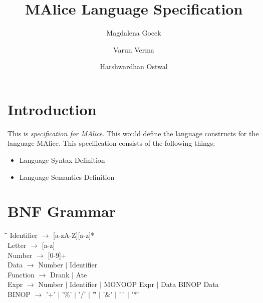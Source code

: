 \documentclass[a4wide, 11pt]{article}
\begin{document}
\title{MAlice Language Specification}

\author{Magdalena Gocek \and Varun Verma \and Harshwardhan Ostwal}


\maketitle            %

\section{Introduction}

This is \emph{specification for MAlice}. This would define the language
constructs for the language MAlice. This specification consists of
the following things:
\begin{itemize}
	\item Language Syntax Definition
	\item Language Semantics Definition
\end{itemize}



\section{BNF Grammar}
	\begin{tabbing}
	\hspace*{9mm}\=\hspace*{10mm}\=\kill
		\> Identifier $\rightarrow$ [a-zA-Z][a-z]* \\
		\> Letter $\rightarrow$ [a-z] \\
		\> Number $\rightarrow$ [0-9]+ \\
		\> Data $\rightarrow$ Number $\mid$ Identifier \\
		\> Function $\rightarrow$ Drank $\mid$ Ate \\
		\> Expr	$\rightarrow$ Number $\mid$ Identifier $\mid$ MONOOP Expr 
					$\mid$ Data BINOP Data \\
		\> BINOP $\rightarrow$ '+' $\mid$ '$\%$' $\mid$ '/' $\mid$ '\^' 
							$\mid$ '$\&$' $\mid$ '$\mid$' $\mid$ '$\ast$' \\
	\end{tabbing}
\end{document}

